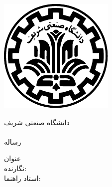 \begin{center}
\thispagestyle{empty}
\includegraphics{Figs/logo} \\
\begin{Large}
دانشگاه صنعتی شریف \\
\fadepart \\ [1cm]
رساله  \falevel \\

\end{Large}
\vskip 3cm
\large{عنوان}  \\ \textbf{\large{\fatitle}}
\vskip 2cm
\large{نگارنده:} \\ \Large{\faAuthor}
\vskip 2cm
\large{استاد راهنما:} \\ \Large{\fasupervisor}
\vskip 2cm
\large{\fadate}
\end{center}

